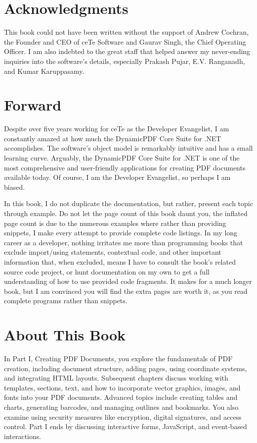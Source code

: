 \documentclass[american,letterpaper]{tufte-book}
\numberwithin{equation}{section}
\numberwithin{figure}{section}
\begin{document}
\chapter*{Acknowledgments}

This book could not have been written without the support of Andrew
Cochran, the Founder and CEO of ceTe Software and Gaurav Singh, the
Chief Operating Officer. I am also indebted to the great staff that
helped answer my never-ending inquiries into the software's details,
especially Prakash Pujar, E.V. Ranganadh, and Kumar Karuppasamy.

\chapter*{Forward}

Despite over five years working for ceTe as the Developer Evangelist,
I am constantly amazed at how much the DynamicPDF Core Suite for .NET
accomplishes. The software’s object model is remarkably intuitive
and has a small learning curve. Arguably, the DynamicPDF Core Suite
for .NET is one of the most comprehensive and user-friendly applications
for creating PDF documents available today. Of course, I am the Developer
Evangelist, so perhaps I am biased. 

In this book, I do not duplicate the documentation, but rather, present
each topic through example. Do not let the page count of this book
daunt you, the inflated page count is due to the numerous examples
where rather than providing snippets, I make every attempt to provide
complete code listings. In my long career as a developer, nothing
irritates me more than programming books that exclude import/using
statements, contextual code, and other important information that,
when excluded, means I have to consult the book’s related source code
project, or hunt documentation on my own to get a full understanding
of how to use provided code fragments. It makes for a much longer
book, but I am convinced you will find the extra pages are worth it,
as you read complete programs rather than snippets.
\chapter*{About This Book} 
In Part I, Creating PDF Documents, you explore the fundamentals of PDF creation, including document structure, adding pages, using coordinate systems, and integrating HTML layouts. Subsequent chapters discuss working with templates, sections, text, and how to incorporate vector graphics, images, and fonts into your PDF documents. Advanced topics include creating tables and charts, generating barcodes, and managing outlines and bookmarks. You also examine using security measures like encryption, digital signatures, and access control. Part I ends by discussing interactive forms, JavaScript, and event-based interactions.
\end{document}
